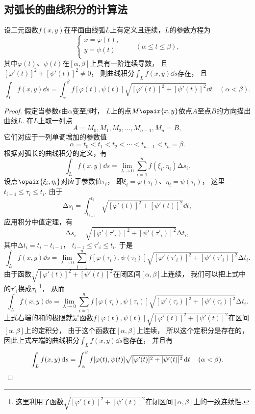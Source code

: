 \subsection{对弧长的曲线积分的计算法}
\begin{theorem}
设二元函数\(f(x,y)\)在平面曲线弧\(L\)上有定义且连续，\(L\)的参数方程为\[
\left\{ \begin{array}{l}
x = \varphi(t), \\
y = \psi(t) \\
\end{array} \right.
\qquad
(\alpha \leqslant t \leqslant \beta),
\]其中\(\varphi(t)\)、\(\psi(t)\)在\([\alpha,\beta]\)上具有一阶连续导数，%
且\([\varphi'(t)]^2+[\psi'(t)]^2 \neq 0\)，%
则曲线积分\(\int_L f(x,y) \dd{s}\)存在，%
且\begin{equation}\label{equation:线积分与面积分.第一类曲线积分的计算式1}
\int_L f(x,y) \dd{s}
= \int_{\alpha}^{\beta} f[\varphi(t),\psi(t)] \sqrt{[\varphi'(t)]^2+[\psi'(t)]^2} \dd{t}
\quad(\alpha<\beta).
\end{equation}
\begin{proof}
假定当参数\(t\)由\(\alpha\)变至\(\beta\)时，%
\(L\)上的点\(M\opair{x,y}\)依点\(A\)至点\(B\)的方向描出曲线\(L\).
在\(L\)上取一列点\[
A=M_0,M_1,M_2,\dotsc,M_{n-1},M_n=B,
\]它们对应于一列单调增加的参数值\[
\alpha=t_0<t_1<t_2<\dotsb<t_{n-1}<t_n=\beta.
\]根据对弧长的曲线积分的定义，有\[
\int_L f(x,y) \dd{s} = \lim\limits_{\lambda\to0} \sum\limits_{i=1}^n f(\xi_i,\eta_i) \increment s_i.
\]设点\(\opair{\xi_i,\eta_i}\)对应于参数值\(\tau_i\)，%
即\(\xi_i=\varphi(\tau_i)\)、\(\eta_i=\psi(\tau_i)\)，%
这里\(t_{i-1}\leqslant\tau_i\leqslant t_i\).
由于\[
\increment s_i = \int_{t_{i-1}}^{t_i} \sqrt{[\varphi'(t)]^2+[\psi'(t)]^2} \dd{t},
\]应用积分中值定理，有\[
\increment s_i = \sqrt{[\varphi'(\tau'_i)]^2+[\psi'(\tau'_i)]^2} \increment t_i,
\]其中\(\increment t_i = t_i - t_{i-1}\)，%
\(t_{i-1} \leqslant \tau'_i \leqslant t_i\).
于是\[
\int_L f(x,y) \dd{s}
= \lim\limits_{\lambda\to0} \sum\limits_{i=1}^n f[\varphi(\tau_i),\psi(\tau_i)] \sqrt{[\varphi'(\tau'_i)]^2+[\psi'(\tau'_i)]^2} \increment t_i.
\]由于函数\(\sqrt{[\varphi'(t)]^2+[\psi'(t)]^2}\)在闭区间\([\alpha,\beta]\)上连续，%
我们可以把上式中的\(\tau'_i\)换成\(\tau_i\)
\footnote{这里利用了函数\(\sqrt{[\varphi'(t)]^2+[\psi'(t)]^2}\)在闭区间\([\alpha,\beta]\)上的一致连续性.}，%
从而\[
\int_L f(x,y) \dd{s}
= \lim\limits_{\lambda\to0} \sum\limits_{i=1}^n f[\varphi(\tau_i),\psi(\tau_i)] \sqrt{[\varphi'(\tau_i)]^2+[\psi'(\tau_i)]^2} \increment t_i.
\]上式右端的和的极限就是函数\(f[\varphi(t),\psi(t)] \sqrt{[\varphi'(t)]^2+[\psi'(t)]^2}\)在区间\([\alpha,\beta]\)上的定积分，%
由于这个函数在\([\alpha,\beta]\)上连续，%
所以这个定积分是存在的，%
因此上式左端的曲线积分\(\int_L f(x,y) \dd{s}\)也存在，%
并且有\[
\int_L f(x,y) \dd{s}
=\int_{\alpha}^{\beta}
 f[\varphi(t),\psi(t)]
 \sqrt{[\varphi'(t)]^2+[\psi'(t)]^2}
 \dd{t}
\quad(\alpha<\beta).
\qedhere
\]
\end{proof}
\end{theorem}
